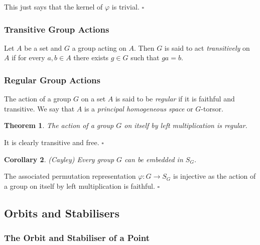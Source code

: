 \documentclass[10pt]{article}
\newtheorem{theorem}{Theorem}[section]
\newtheorem{corollary}[theorem]{Corollary}
\newenvironment{proof}[1][Proof]{\begin{trivlist}
\item[\hskip \labelsep {\itshape #1}]}{\end{trivlist}}
\newenvironment{definition}[1][Definition]{\begin{trivlist}
\item[\hskip \labelsep {\bfseries #1}]}{\end{trivlist}}
\begin{document}
\begin{proof}
This just says that the kernel of $\varphi$ is trivial. $\square$
\end{proof}

\subsubsection{Transitive Group Actions}

\begin{definition}
Let $A$ be a set and $G$ a group acting on $A$. Then $G$ is said to act \emph{transitively} on $A$ if for every $a, b \in A$ there exists $g \in G$ such that $ga = b$.
\end{definition}

\subsubsection{Regular Group Actions}

\begin{definition}
The action of a group $G$ on a set $A$ is said to be \emph{regular} if it is faithful and transitive. We say that $A$ is a \emph{principal homogeneous space} or $G$-torsor.
\end{definition}

\begin{theorem}
The action of a group $G$ on itself by left multiplication is regular.
\end{theorem}

\begin{proof}
It is clearly transitive and free. $\square$
\end{proof}

\begin{corollary} (Cayley)
Every group $G$ can be embedded in $S_G$.
\end{corollary}

\begin{proof}
The associated permutation representation $\varphi : G \to S_G$ is injective as the action of a group on itself by left multiplication is faithful. $\square$
\end{proof}

\subsection{Orbits and Stabilisers}

\subsubsection{The Orbit and Stabiliser of a Point}
\end{document}
